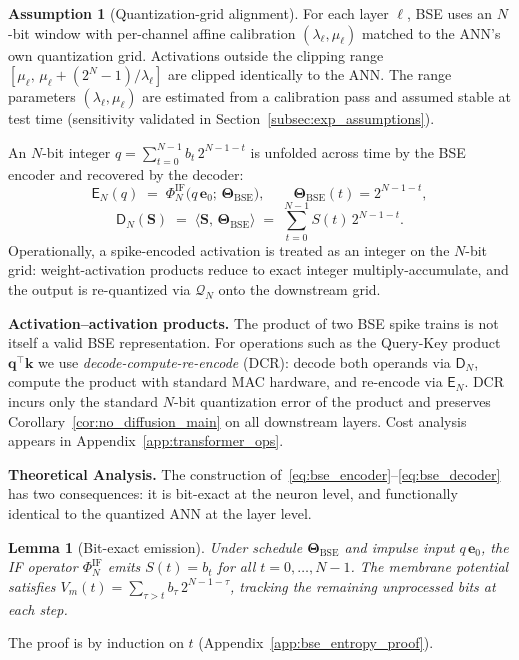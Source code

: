 \documentclass{article}
\theoremstyle{plain}
\newtheorem{lemma}[theorem]{Lemma}
\theoremstyle{definition}
\newtheorem{assumption}[theorem]{Assumption}
\theoremstyle{remark}
\begin{document}
\begin{assumption}[Quantization-grid alignment]
\label{asm:quantization_alignment}
For each layer $\ell$, BSE uses an $N$-bit window with per-channel affine
calibration $(\lambda_\ell,\mu_\ell)$ matched to the ANN's own quantization
grid. Activations outside the clipping range
$[\mu_\ell,\, \mu_\ell+(2^N-1)/\lambda_\ell]$ are clipped identically to the
ANN. The range parameters $(\lambda_\ell,\mu_\ell)$ are estimated from a
calibration pass and assumed stable at test time (sensitivity validated in
Section~\ref{subsec:exp_assumptions}).
\end{assumption}

An $N$-bit integer $q=\sum_{t=0}^{N-1} b_t\,2^{N-1-t}$ is unfolded across
time by the BSE encoder and recovered by the decoder:
\begin{equation}
\label{eq:bse_encoder}
\mathsf{E}_N(q)
  \;=\; \Phi_N^{\mathrm{IF}}\!\bigl(q\,\mathbf{e}_0;\,
          \boldsymbol{\Theta}_{\mathrm{BSE}}\bigr),
\qquad
\boldsymbol{\Theta}_{\mathrm{BSE}}(t)=2^{N-1-t},
\end{equation}
\begin{equation}
\label{eq:bse_decoder}
\mathsf{D}_N(\mathbf{S})
  \;=\; \langle \mathbf{S},\,\boldsymbol{\Theta}_{\mathrm{BSE}}\rangle
  \;=\; \sum_{t=0}^{N-1} S(t)\,2^{N-1-t}.
\end{equation}
Operationally, a spike-encoded activation is treated as an integer on the
$N$-bit grid: weight-activation products reduce to exact integer
multiply-accumulate, and the output is re-quantized via $\mathcal{Q}_N$ onto
the downstream grid.

\noindent\textbf{Activation--activation products.}
The product of two BSE spike trains is not itself a valid BSE representation.
For operations such as the Query-Key product $\mathbf{q}^\top\mathbf{k}$ we
use \emph{decode-compute-re-encode} (DCR): decode both operands via
$\mathsf{D}_N$, compute the product with standard MAC hardware, and re-encode
via $\mathsf{E}_N$. DCR incurs only the standard $N$-bit quantization error
of the product and preserves Corollary~\ref{cor:no_diffusion_main} on all
downstream layers. Cost analysis appears in
Appendix~\ref{app:transformer_ops}.

\noindent\textbf{Theoretical Analysis.}
\label{subsubsec:bse_theory}
The construction of~\eqref{eq:bse_encoder}--\eqref{eq:bse_decoder} has two
consequences: it is bit-exact at the neuron level, and functionally identical
to the quantized ANN at the layer level.

\begin{lemma}[Bit-exact emission]
\label{lem:bit_exact_main}
Under schedule $\boldsymbol{\Theta}_{\mathrm{BSE}}$ and impulse input
$q\,\mathbf{e}_0$, the IF operator $\Phi_N^{\mathrm{IF}}$ emits $S(t)=b_t$
for all $t=0,\dots,N-1$. The membrane potential satisfies
$V_m(t)=\sum_{\tau>t}b_\tau\,2^{N-1-\tau}$, tracking the remaining
unprocessed bits at each step.
\end{lemma}
The proof is by induction on $t$ (Appendix~\ref{app:bse_entropy_proof}).
\end{document}
